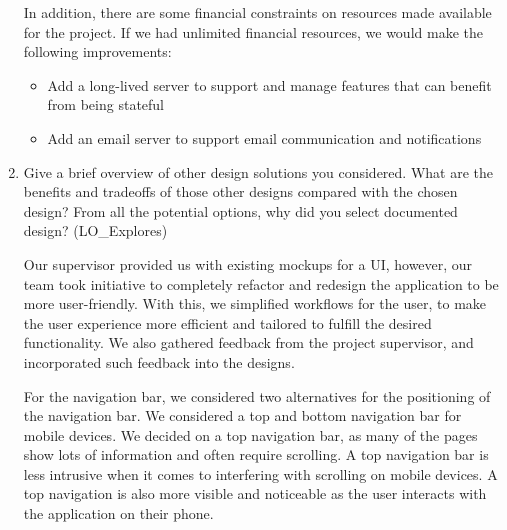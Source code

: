 \documentclass[12pt, titlepage]{article}
\begin{document}
\begin{enumerate}
	      In addition, there are some financial constraints on resources made available for the project. If
	      we had unlimited financial resources, we would make the following improvements:
	      \begin{itemize}
		      \item Add a long-lived server to support and manage features that can benefit from being stateful
		      \item Add an email server to support email communication and notifications
	      \end{itemize}

	\item Give a brief overview of other design solutions you considered. What are the benefits and tradeoffs
	      of those other designs compared with the chosen design? From all the potential options, why did you
	      select documented design? (LO\_Explores)

	      Our supervisor provided us with existing mockups for a UI, however, our team took initiative to
	      completely refactor and redesign the application to be more user-friendly. With this, we simplified
	      workflows for the user, to make the user experience more efficient and tailored to fulfill the
	      desired functionality. We also gathered feedback from the project supervisor, and incorporated such
	      feedback into the designs.

	      For the navigation bar, we considered two alternatives for the positioning of the navigation bar.
	      We considered a top and bottom navigation bar for mobile devices. We decided on a top navigation
	      bar, as many of the pages show lots of information and often require scrolling. A top navigation
	      bar is less intrusive when it comes to interfering with scrolling on mobile devices. A top
	      navigation is also more visible and noticeable as the user interacts with the application on their
	      phone.

\end{enumerate}
\end{document}
